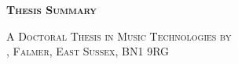 {}
\begin{flushleft}
	\Huge \textsc{\textbf{Thesis Summary}}
\end{flushleft}
\begin{flushright}
    {\normalsize \textsc{A Doctoral Thesis in Music Technologies by \myName}\\}
    {\normalsize \textsc{\myUni, Falmer, East Sussex, BN1 9RG} \\} %
    {\normalsize \textsc{\myFaculty} \\} %
    {\normalsize \textsc{\myDepartment}} %
\end{flushright}
\begin{flushleft}
    \Large \myTitle \\%
    \normalsize \mySubtitle \\
\end{flushleft}

